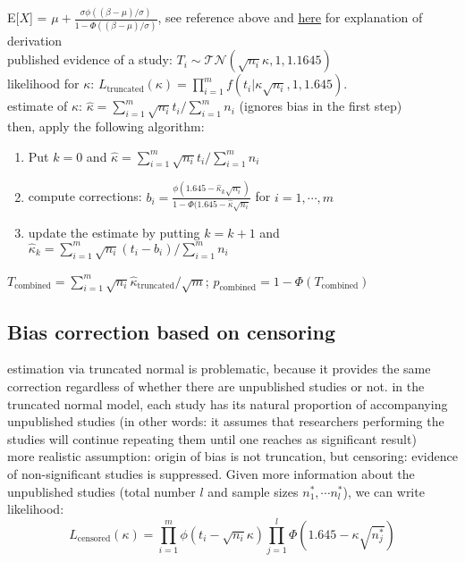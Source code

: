 E[$X$] = $\mu + \frac{\sigma\phi((\beta-\mu)/\sigma)}{1-\Phi((\beta-\mu)/\sigma)}$, see reference above and \href{https://stats.stackexchange.com/questions/356023/expectation-of-truncated-normal?rq=1}{here} for explanation of derivation\\
published evidence of a study: $T_i \sim \mathcal{TN}(\sqrt{n_i}\kappa,1,1.1645)$\\
likelihood for $\kappa$: $L_{\text{truncated}}(\kappa) = \prod\limits_{i=1}^m f(t_i|\kappa \sqrt{n_i},1,1.645)$.\\
estimate of $\kappa$: $\hat{\kappa} = \sum\limits_{i=1}^m \sqrt{n_i}t_i/\sum\limits_{i=1}^m n_i$ (ignores bias in the first step)\\

then, apply the following algorithm:
\begin{enumerate}
    \item Put $k=0$ and $\hat{\kappa} = \sum\limits_{i=1}^{m}\sqrt{n_i}t_i / \sum\limits_{i=1}^m n_i$
    \item compute corrections: $b_i = \frac{\phi(1.645-\hat{\kappa}_k\sqrt{n_i})}{1-\Phi(1.645-\hat{\kappa}\sqrt{n_i}}$ for $i=1,\cdots,m$
    \item update the estimate by putting $k=k+1$ and $\hat{\kappa}_k = \sum\limits_{i=1}^m \sqrt{n_i}(t_i-b_i) / \sum\limits_{i=1}^m n_i$
\end{enumerate}

$T_{\text{combined}}= \sum\limits_{i=1}^m \sqrt{n_i} \hat{\kappa}_\text{truncated}/\sqrt{m}$; $p_\text{combined} = 1-\Phi(T_\text{combined})$

\subsection{Bias correction based on censoring}
estimation via truncated normal is problematic, because it provides the same correction regardless of whether there are unpublished studies or not. in the truncated normal model, each study has its natural proportion of accompanying unpublished studies (in other words: it assumes that researchers performing the studies will continue repeating them until one reaches as significant result)\\

more realistic assumption: origin of bias is not truncation, but censoring: evidence of non-significant studies is suppressed. Given more information about the unpublished studies (total number $l$ and sample sizes $n_1^*, \cdots n_l^*$), we can write likelihood:
$$L_\text{censored}(\kappa) = \prod\limits_{i=1}^m \phi(t_i-\sqrt{n_i}\kappa) \prod\limits_{j=1}^l \Phi(1.645-\kappa\sqrt{n_j^*})$$\\

